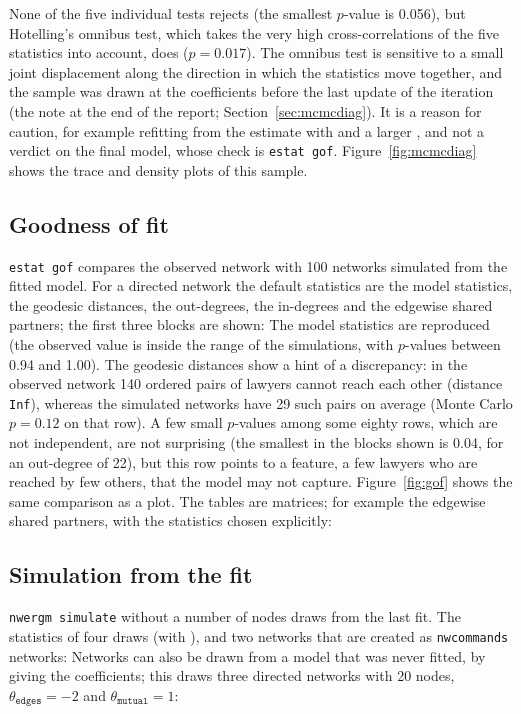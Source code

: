 None of the five individual tests rejects (the smallest $p$-value is 0.056), but Hotelling's omnibus test, which takes the very high cross-correlations of the five statistics into account, does ($p=0.017$). The omnibus test is sensitive to a small joint displacement along the direction in which the statistics move together, and the sample was drawn at the coefficients before the last update of the iteration (the note at the end of the report; Section~\ref{sec:mcmcdiag}). It is a reason for caution, for example refitting from the estimate with  and a larger , and not a verdict on the final model, whose check is \texttt{estat gof}.
Figure~\ref{fig:mcmcdiag} shows the trace and density plots of this sample.

\subsection{Goodness of fit}

\texttt{estat gof} compares the observed network with 100 networks simulated from the fitted model. For a directed network the default statistics are the model statistics, the geodesic distances, the out-degrees, the in-degrees and the edgewise shared partners; the first three blocks are shown:
The model statistics are reproduced (the observed value is inside the range of the simulations, with $p$-values between 0.94 and 1.00). The geodesic distances show a hint of a discrepancy: in the observed network 140 ordered pairs of lawyers cannot reach each other (distance \texttt{Inf}), whereas the simulated networks have 29 such pairs on average (Monte Carlo $p=0.12$ on that row). A few small $p$-values among some eighty rows, which are not independent, are not surprising (the smallest in the blocks shown is 0.04, for an out-degree of 22), but this row points to a feature, a few lawyers who are reached by few others, that the model may not capture. Figure~\ref{fig:gof} shows the same comparison as a plot. The tables are matrices; for example the edgewise shared partners, with the statistics chosen explicitly:

\subsection{Simulation from the fit}

\texttt{nwergm simulate} without a number of nodes draws from the last fit. The statistics of four draws (with ), and two networks that are created as \texttt{nwcommands} networks:
Networks can also be drawn from a model that was never fitted, by giving the coefficients; this draws three directed networks with 20 nodes, $\theta_{\mathtt{edges}}=-2$ and $\theta_{\mathtt{mutual}}=1$:


